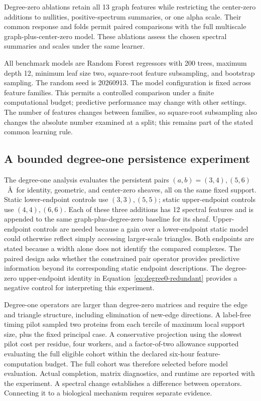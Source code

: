 \documentclass[11pt]{article}
\begin{document}
Degree-zero ablations retain all 13 graph features while restricting the center-zero additions to nullities, positive-spectrum summaries, or one alpha scale. Their common response and folds permit paired comparisons with the full multiscale graph-plus-center-zero model. These ablations assess the chosen spectral summaries and scales under the same learner.

All benchmark models are Random Forest regressors \citep{breiman2001} with 200 trees, maximum depth 12, minimum leaf size two, square-root feature subsampling, and bootstrap sampling. The random seed is 20260913. The model configuration is fixed across feature families. This permits a controlled comparison under a finite computational budget; predictive performance may change with other settings. The number of features changes between families, so square-root subsampling also changes the absolute number examined at a split; this remains part of the stated common learning rule.


\subsection{A bounded degree-one persistence experiment}
The degree-one analysis evaluates the persistent pairs $(a,b)=(3,4),(5,6)$~\AA\ for identity, geometric, and center-zero sheaves, all on the same fixed support. Static lower-endpoint controls use $(3,3),(5,5)$; static upper-endpoint controls use $(4,4),(6,6)$. Each of these three additions has 12 spectral features and is appended to the same graph-plus-degree-zero baseline for its sheaf. Upper-endpoint controls are needed because a gain over a lower-endpoint static model could otherwise reflect simply accessing larger-scale triangles. Both endpoints are stated because a width alone does not identify the compared complexes. The paired design asks whether the constrained pair operator provides predictive information beyond its corresponding static endpoint descriptions. The degree-zero upper-endpoint identity in Equation~\eqref{eq:degree0-redundant} provides a negative control for interpreting this experiment.

Degree-one operators are larger than degree-zero matrices and require the edge and triangle structure, including elimination of new-edge directions. A label-free timing pilot sampled two proteins from each tercile of maximum local support size, plus the fixed principal case. A conservative projection using the slowest pilot cost per residue, four workers, and a factor-of-two allowance supported evaluating the full eligible cohort within the declared six-hour feature-computation budget. The full cohort was therefore selected before model evaluation. Actual completion, matrix diagnostics, and runtime are reported with the experiment. A spectral change establishes a difference between operators. Connecting it to a biological mechanism requires separate evidence.
\end{document}

